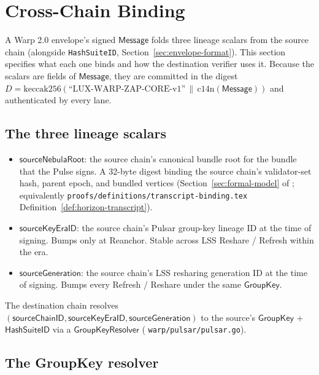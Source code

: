 \section{Cross-Chain Binding}
\label{sec:cross-chain-binding}

A Warp 2.0 envelope's signed $\mathsf{Message}$ folds three lineage scalars from the source chain (alongside \texttt{HashSuiteID}, Section~\ref{sec:envelope-format}). This section specifies what each one binds and how the destination verifier uses it. Because the scalars are fields of $\mathsf{Message}$, they are committed in the digest $D = \mathrm{keccak256}(\text{``LUX-WARP-ZAP-CORE-v1''}\,\|\,\mathrm{c14n}(\mathsf{Message}))$ and authenticated by every lane.

\subsection{The three lineage scalars}

\begin{itemize}[leftmargin=2em,nosep]
  \item $\mathsf{sourceNebulaRoot}$: the source chain's canonical bundle root for the bundle that the Pulse signs. A 32-byte digest binding the source chain's validator-set hash, parent epoch, and bundled vertices (Section~\ref{sec:formal-model} of \cite{luxquasarhorizon}; equivalently \texttt{proofs/definitions/transcript-binding.tex} Definition~\ref{def:horizon-transcript}).
  \item $\mathsf{sourceKeyEraID}$: the source chain's Pulsar group-key lineage ID at the time of signing. Bumps only at Reanchor. Stable across LSS Reshare / Refresh within the era.
  \item $\mathsf{sourceGeneration}$: the source chain's LSS resharing generation ID at the time of signing. Bumps every Refresh / Reshare under the same $\mathsf{GroupKey}$.
\end{itemize}

The destination chain resolves $(\mathsf{sourceChainID}, \mathsf{sourceKeyEraID}, \mathsf{sourceGeneration})$ to the source's $\mathsf{GroupKey}$ + $\mathsf{HashSuiteID}$ via a $\mathsf{GroupKeyResolver}$ (\cite{warpgo} \texttt{warp/pulsar/pulsar.go}).

\subsection{The GroupKey resolver}

